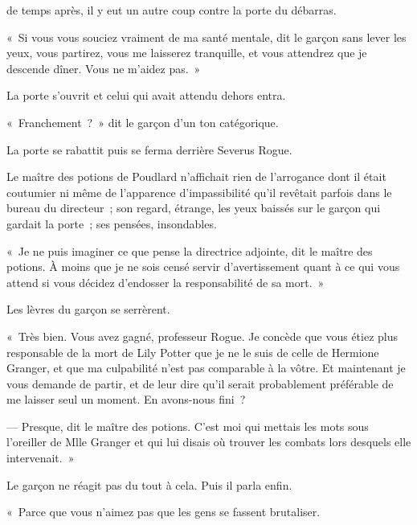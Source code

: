 
 de temps après, il y eut un autre coup contre la porte du débarras.

\hplettrineextrapara
«~Si vous vous souciez vraiment de ma santé mentale, dit le garçon sans lever les yeux, vous partirez, vous me laisserez tranquille, et vous attendrez que je descende dîner.
Vous ne m'aidez pas.~»

La porte s'ouvrit et celui qui avait attendu dehors entra.

«~Franchement~?~»
dit le garçon d'un ton catégorique.

La porte se rabattit puis se ferma derrière Severus Rogue.

Le maître des potions de Poudlard n'affichait rien de l'arrogance dont il était coutumier ni même de l'apparence d'impassibilité qu'il revêtait parfois dans le bureau du directeur~; son regard, étrange, les yeux baissés sur le garçon qui gardait la porte~; ses pensées, insondables.

«~Je ne puis imaginer ce que pense la directrice adjointe, dit le maître des potions.
À moins que je ne sois censé servir d'avertissement quant à ce qui vous attend si vous décidez d'endosser la responsabilité de sa mort.~»

Les lèvres du garçon se serrèrent.

«~Très bien.
Vous avez gagné, professeur Rogue.
Je concède que vous étiez plus responsable de la mort de Lily Potter que je ne le suis de celle de Hermione Granger, et que ma culpabilité n'est pas comparable à la vôtre.
Et maintenant je vous demande de partir, et de leur dire qu'il serait probablement préférable de me laisser seul un moment.
En avons-nous fini~?

--- Presque, dit le maître des potions.
C'est moi qui mettais les mots sous l'oreiller de Mlle Granger et qui lui disais où trouver les combats lors desquels elle intervenait.~»

Le garçon ne réagit pas du tout à cela.
Puis il parla enfin.

«~Parce que vous n'aimez pas que les gens se fassent brutaliser.

